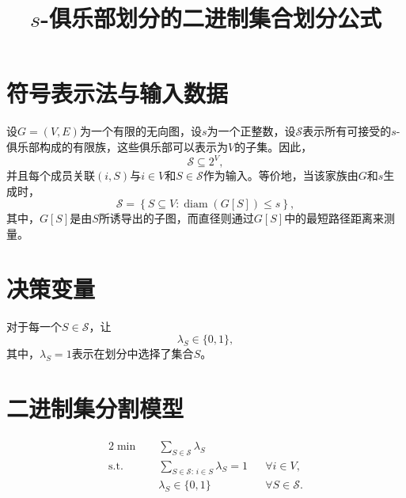 \documentclass[11pt]{article}
\title{$s$-俱乐部划分的二进制集合划分公式}
\author{}
\date{}
\begin{document}
\maketitle

\section*{符号表示法与输入数据}

设$G=(V,E)$为一个有限的无向图，设$s$为一个正整数，设$\mathcal{S}$表示所有可接受的$s$-俱乐部构成的有限族，这些俱乐部可以表示为$V$的子集。因此，
\[
\mathcal{S}\subseteq 2^V,
\]
并且每个成员关联$(i,S)$与$i\in V$和$S\in\mathcal{S}$作为输入。等价地，当该家族由$G$和$s$生成时，
\[
\mathcal{S}
=
\left\{S\subseteq V:\operatorname{diam}(G[S])\le s\right\},
\]
其中，$G[S]$是由$S$所诱导出的子图，而直径则通过$G[S]$中的最短路径距离来测量。

\section*{决策变量}

对于每一个$S\in\mathcal{S}$，让
\[
\lambda_S\in\{0,1\},
\]
其中，$\lambda_S=1$表示在划分中选择了集合$S$。

\section*{二进制集分割模型}

\begin{alignat}{2}
\min\quad & \sum_{S\in\mathcal{S}}\lambda_S && \tag{2a}\\
\text{s.t.}\quad
& \sum_{S\in\mathcal{S}:\,i\in S}\lambda_S = 1
&& \forall i\in V, \tag{2b}\\
& \lambda_S\in\{0,1\}
&& \forall S\in\mathcal{S}. \tag{2c}
\end{alignat}
\end{document}
